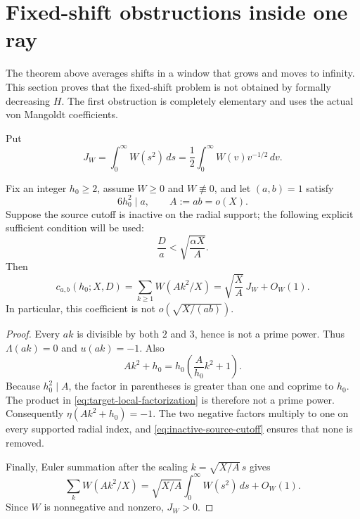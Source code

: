 \section{Fixed-shift obstructions inside one ray}
\label{sec:fixed-boundary}

The theorem above averages shifts in a window that grows and moves to
infinity.  This section proves that the fixed-shift problem is not obtained
by formally decreasing $H$.  The first obstruction is completely
elementary and uses the actual von Mangoldt coefficients.

Put
\begin{equation}
 J_W=\int_0^\infty W(s^2)\,ds
 =\frac12\int_0^\infty W(v)v^{-1/2}\,dv.
 \label{eq:JW-definition}
\end{equation}

\begin{theorem}
\label{thm:sign-coherent-family}
Fix an integer $h_0\geq2$, assume $W\geq0$ and $W\not\equiv0$, and let
$(a,b)=1$ satisfy
\begin{equation}
 6h_0^2\mid a,\qquad A:=ab=o(X).
 \label{eq:sign-ray-hypotheses}
\end{equation}
Suppose the source cutoff is inactive on the radial support; the following
explicit sufficient condition will be used:
\begin{equation}
 \frac Da<\sqrt{\frac{\alpha X}{A}}.
 \label{eq:inactive-source-cutoff}
\end{equation}
Then
\begin{equation}
 c_{a,b}(h_0;X,D)
 =\sum_{k\geq1}W(Ak^2/X)
 =\sqrt{\frac XA}\,J_W+O_W(1).
 \label{eq:sign-coherent-asymptotic}
\end{equation}
In particular, this coefficient is not
$o(\sqrt{X/(ab)})$.
\end{theorem}

\begin{proof}
Every $ak$ is divisible by both $2$ and $3$, hence is not a prime power.
Thus $\Lambda(ak)=0$ and $u(ak)=-1$.  Also
\begin{equation}
 Ak^2+h_0
 =h_0\left(\frac{A}{h_0}k^2+1\right).
 \label{eq:target-local-factorization}
\end{equation}
Because $h_0^2\mid A$, the factor in parentheses is greater than one and
coprime to $h_0$.  The product in
\eqref{eq:target-local-factorization} is therefore not a prime power.
Consequently $\eta(Ak^2+h_0)=-1$.  The two negative factors multiply to
one on every supported radial index, and
\eqref{eq:inactive-source-cutoff} ensures that none is removed.

Finally, Euler summation after the scaling
$k=\sqrt{X/A}\,s$ gives
\[
 \sum_kW(Ak^2/X)
 =\sqrt{X/A}\int_0^\infty W(s^2)\,ds+O_W(1).
\]
Since $W$ is nonnegative and nonzero, $J_W>0$.
\end{proof}

